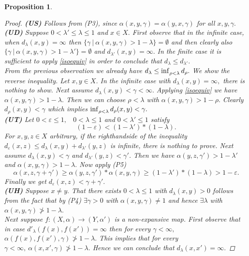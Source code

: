 \documentclass[12pt,a4paper]{amsart}
\theoremstyle{theorem}
\newtheorem{proposition}[theorem]{Proposition}
\theoremstyle{definition}
\renewcommand{\inf}{\myinf}
\DeclareMathOperator*{\myinf}{in\vphantom{p}f}
\renewcommand{\a}{\ensuremath{\alpha}}
\newcommand{\ve}{\ensuremath{\varepsilon}}
\renewcommand{\l}{\ensuremath{\lambda}}
\def\rw{\rightarrow}
\begin{document}
{\begin{proposition}
\begin{proof}
{\bf{(US)}} Follows from (P3), since $\a(x,y,\gamma) = \a(y,x,\gamma)$ for all $x,y,\gamma.$\\
{\bf(UD)} Suppose $0 < \l' \leq \l \leq 1$ and $x \in X.$ First observe that in the infinite case, when $d_\l(x,y) = \infty$ then $\{ \gamma \ | \ \a(x,y,\gamma) > 1 - \l \} = \emptyset $ and then clearly also $\{ \gamma \ | \ \a(x,y,\gamma) > 1 - \l' \} = \emptyset $ and $d_{\l'}(x,y) = \infty.$
In the finite case  it is sufficient to apply \eqref{isoequiv} in order to conclude that $d_\l  \leq  d_{\l'}.$\\
From the previous observation we already have $d_\l \leq \inf _{\rho < \l} d_\rho.$
We show the reverse inequality. Let $x,y \in X$. In the infinite case with $d_\l(x,y) = \infty,$ there is nothing to show.
Next assume $d_\l(x,y) <  \gamma < \infty.$ Applying \eqref{isoequiv} we have $\a(x,y,\gamma) > 1 - \l.$ Then we can choose $\rho < \l$ with 
$\a(x,y,\gamma) > 1 - \rho.$ Clearly $d_\rho(x,y) < \gamma$ which implies $ \inf _{\rho < \l} d_\rho(x,y) < \gamma.$\\
{\bf(UT)} 
Let $0 < \ve \leq 1,$ \  $0 < \l \leq 1$ and $0 < \l' \leq 1$ satisfy
$$ (1 - \ve ) < (1 - \l') * ( 1 - \l).$$ 
For $x,y,z \in X$ arbitrary,
if the righthandside of the inequality $d_\ve(x,z) \leq d_\l(x,y) + d_{\l'}(y,z)$ is infinite, there is nothing to prove. Next assume $d_\l(x,y) < \gamma$ and  $d_{\l'}(y,z) < \gamma'$. Then we have $\a(y,z, \gamma') > 1 - \l'$ and $\a(x,y, \gamma) > 1 - \l.$
Now apply (P5)
$$
\a(x,z,\gamma + \gamma') \geq \a(y,z, \gamma')  * \a(x,y, \gamma) \geq (1 - \l') * ( 1 - \l)  > 1-\ve.
$$
Finally we get $d_\ve(x,z) < \gamma + \gamma'.$\\
{\bf(UH)} 
Suppose $x \not = y.$ That there exists $0 < \l \leq 1$ with $d_\l(x,y) > 0$ follows from the fact that by (P4) $\exists \gamma > 0$ with $\a(x,y,\gamma) \not = 1$ and hence $\exists \l$ with $\a(x,y,\gamma )\not  > 1 - \l.$\\



Next suppose $f: (X,\a) \rw (Y, \a')$ is a non-expansive map.
First observe that in case $d'_\l (f(x), f(x'))= \infty$ then for every $\gamma < \infty,$
$ \a(f(x), f(x'), \gamma) \not > 1 - \l.$
This implies that for every $\gamma < \infty, \ \a(x,x',\gamma) \not > 1 - \l.$ Hence we can conclude that $d_\l(x,x') = \infty.$


\end{proof}
\end{proposition}}
\end{document}
